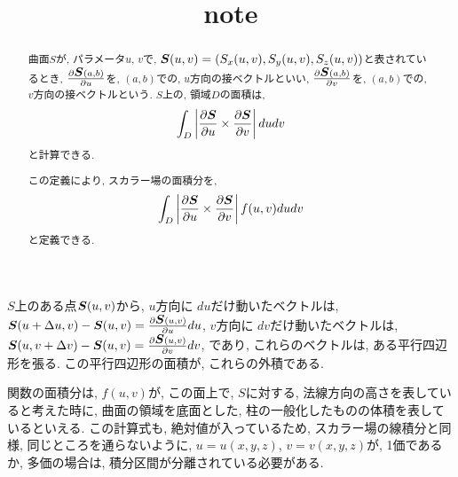 \documentclass{jsarticle} \usepackage[dvipdfmx]{graphicx} \usepackage[dvipdfmx]{hyperref}
\title{note}
\newcommand*{\mbold}[1]{\mbox{\boldmath $#1$}}
\begin{document}
\maketitle

\begin{abstract}
  曲面$S$が, パラメータ$u$, $v$で, $\mbold{S}(u, v) = (S_x(u, v), S_y(u, v), S_z(u, v))$と表されているとき, 
  $\frac{\partial \mbold{S}(a, b)}{\partial u}$を, $(a, b)$での, $u$方向の接ベクトルといい, 
  $\frac{\partial \mbold{S}(a, b)}{\partial v}$を, $(a, b)$での, $v$方向の接ベクトルという. 
  $S$上の, 領域$D$の面積は, 
  \begin{equation}
    \int_D \left| \frac{\partial \mbold{S}}{\partial u} \times \frac{\partial \mbold{S}}{\partial v} \right| du dv
  \end{equation}
  と計算できる. 

  この定義により, スカラー場の面積分を, 
  \begin{equation}
    \int_D \left| \frac{\partial \mbold{S}}{\partial u} \times \frac{\partial \mbold{S}}{\partial v} \right| f(u,v)dudv
  \end{equation}
  と定義できる. 

\end{abstract}

$S$上のある点$\mbold{S}(u, v)$から, 
$u$方向に $du$だけ動いたベクトルは, $\mbold{S}(u + \Delta u, v) - \mbold{S}(u, v) = \frac{\partial \mbold{S}(u, v)}{\partial u}du$, 
$v$方向に $dv$だけ動いたベクトルは, $\mbold{S}(u, v + \Delta v) - \mbold{S}(u, v) = \frac{\partial \mbold{S}(u, v)}{\partial v}dv$, 
であり, これらのベクトルは, ある平行四辺形を張る. 
この平行四辺形の面積が, これらの外積である. 

関数の面積分は, $f(u, v)$が, この面上で, $S$に対する, 法線方向の高さを表していると考えた時に, 曲面の領域を底面とした, 柱の一般化したものの体積を表しているといえる. 
この計算式も, 絶対値が入っているため, スカラー場の線積分と同様, 同じところを通らないように, $u = u(x, y, z)$, $v = v(x, y, z)$が, 1価であるか, 多価の場合は, 積分区間が分離されている必要がある. 
\end{document}
